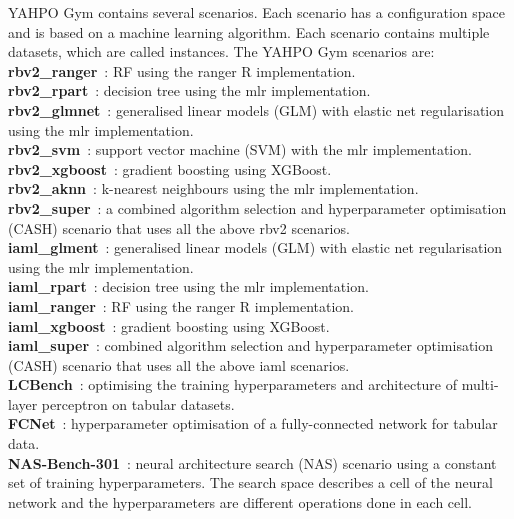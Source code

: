 YAHPO Gym contains several scenarios. 
Each scenario has a configuration space and is based on a machine learning algorithm. 
Each scenario contains multiple datasets, which are called instances. 
The YAHPO Gym scenarios are: \\
    \textbf{rbv2\_ranger}~\citep{BinEtAl20}: RF using the ranger R implementation.\\ 
    \textbf{rbv2\_rpart}~\citep{BinEtAl20}: decision tree using the mlr implementation.\\
    \textbf{rbv2\_glmnet}~\citep{BinEtAl20}: generalised linear models (GLM) with elastic net regularisation using the mlr implementation.\\
    \textbf{rbv2\_svm}~\citep{BinEtAl20}: support vector machine (SVM) with the mlr implementation.\\
    \textbf{rbv2\_xgboost}~\citep{BinEtAl20}: gradient boosting using XGBoost.\\
    \textbf{rbv2\_aknn}~\citep{BinEtAl20}: k-nearest neighbours using the mlr implementation.\\
    \textbf{rbv2\_super}~\citep{BinEtAl20}: a combined algorithm selection and hyperparameter optimisation (CASH) scenario that uses all the above rbv2 scenarios.\\
    \textbf{iaml\_glment}~\citep{PfiEtAl22}: generalised linear models (GLM) with elastic net regularisation using the mlr implementation.\\
    \textbf{iaml\_rpart}~\citep{PfiEtAl22}: decision tree using the mlr implementation.\\
    \textbf{iaml\_ranger}~\citep{PfiEtAl22}: RF using the ranger R implementation.\\
    \textbf{iaml\_xgboost}~\citep{PfiEtAl22}: gradient boosting using XGBoost.\\
    \textbf{iaml\_super}~\citep{PfiEtAl22}: combined algorithm selection and hyperparameter optimisation (CASH) scenario that uses all the above iaml scenarios.\\
    \textbf{LCBench}~\citep{ZimEtAl21b}: optimising the training hyperparameters and architecture of multi-layer perceptron on tabular datasets.\\
    \textbf{FCNet}~\citep{FalEtAl18}: hyperparameter optimisation of a fully-connected network for tabular data.\\
    \textbf{NAS-Bench-301}~\citep{ZelEtAl22}: neural architecture search (NAS) scenario using a constant set of training hyperparameters. The search space describes a cell of the neural network and the hyperparameters are different operations done in each cell.

